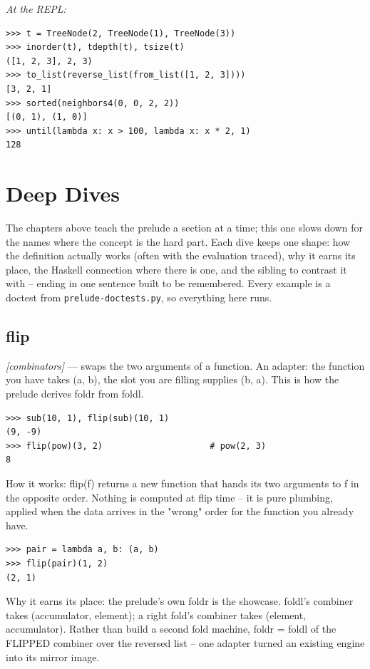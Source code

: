 \documentclass[11pt,letterpaper]{book}
\begin{document}
\noindent\textit{At the REPL:}
\begin{lstlisting}[style=spec]
>>> t = TreeNode(2, TreeNode(1), TreeNode(3))
>>> inorder(t), tdepth(t), tsize(t)
([1, 2, 3], 2, 3)
>>> to_list(reverse_list(from_list([1, 2, 3])))
[3, 2, 1]
>>> sorted(neighbors4(0, 0, 2, 2))
[(0, 1), (1, 0)]
>>> until(lambda x: x > 100, lambda x: x * 2, 1)
128
\end{lstlisting}
\chapter{Deep Dives}
The chapters above teach the prelude a section at a time; this one slows down
for the names where the concept is the hard part. Each dive keeps
one shape: how the definition actually works (often with the evaluation
traced), why it earns its place, the Haskell connection where there is one,
and the sibling to contrast it with -- ending in one sentence built to be
remembered. Every example is a doctest from \texttt{prelude-doctests.py}, so
everything here runs.

\section{flip}
\noindent\textit{[combinators]} --- swaps the two arguments of a function. An adapter: the function you have takes (a, b), the slot you are filling supplies (b, a). This is how the prelude derives foldr from foldl.
\begin{lstlisting}[style=spec]
>>> sub(10, 1), flip(sub)(10, 1)
(9, -9)
>>> flip(pow)(3, 2)                     # pow(2, 3)
8
\end{lstlisting}

How it works: flip(f) returns a new function that hands its two arguments to f in the opposite order. Nothing is computed at flip time -- it is pure plumbing, applied when the data arrives in the "wrong" order for the function you already have.

\begin{lstlisting}[style=spec]
>>> pair = lambda a, b: (a, b)
>>> flip(pair)(1, 2)
(2, 1)
\end{lstlisting}

Why it earns its place: the prelude's own foldr is the showcase. foldl's combiner takes (accumulator, element); a right fold's combiner takes (element, accumulator). Rather than build a second fold machine, foldr = foldl of the FLIPPED combiner over the reversed list -- one adapter turned an existing engine into its mirror image.
\end{document}
